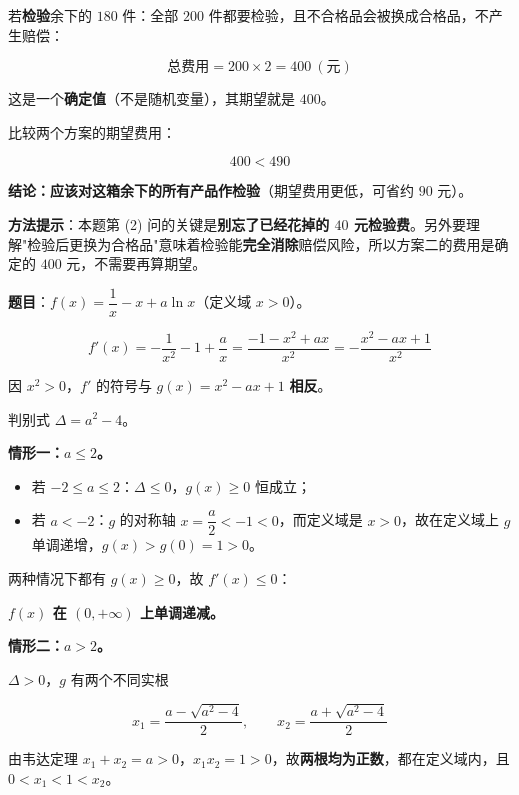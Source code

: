 
若\textbf{检验}余下的 $180$ 件：全部 $200$ 件都要检验，且不合格品会被换成合格品，不产生赔偿：

\[\text{总费用}=200\times2=400\ (\text{元})\]

这是一个\textbf{确定值}（不是随机变量），其期望就是 $400$。

比较两个方案的期望费用：

\[400<490\]

\textbf{结论：应该对这箱余下的所有产品作检验}（期望费用更低，可省约 $90$ 元）。

\begin{gktip}
\textbf{方法提示}：本题第 (2) 问的关键是\textbf{别忘了已经花掉的 $40$ 元检验费}。另外要理解"检验后更换为合格品"意味着检验能\textbf{完全消除}赔偿风险，所以方案二的费用是确定的 $400$ 元，不需要再算期望。
\end{gktip}

\par\medskip


\textbf{题目}：$f(x)=\dfrac1x-x+a\ln x$（定义域 $x>0$）。


\[f'(x)=-\frac1{x^{2}}-1+\frac ax=\frac{-1-x^{2}+ax}{x^{2}}=-\frac{x^{2}-ax+1}{x^{2}}\]

因 $x^{2}>0$，$f'$ 的符号与 $g(x)=x^{2}-ax+1$ \textbf{相反}。

判别式 $\Delta=a^{2}-4$。

\textbf{情形一：$a\le2$。}

\begin{itemize}
\item 若 $-2\le a\le2$：$\Delta\le0$，$g(x)\ge0$ 恒成立；
\item 若 $a<-2$：$g$ 的对称轴 $x=\dfrac a2<-1<0$，而定义域是 $x>0$，故在定义域上 $g$ 单调递增，$g(x)>g(0)=1>0$。
\end{itemize}

两种情况下都有 $g(x)\ge0$，故 $f'(x)\le0$：

\textbf{$f(x)$ 在 $(0,+\infty)$ 上单调递减。}

\textbf{情形二：$a>2$。}

$\Delta>0$，$g$ 有两个不同实根

\[x_1=\frac{a-\sqrt{a^{2}-4}}2,\qquad x_2=\frac{a+\sqrt{a^{2}-4}}2\]

由韦达定理 $x_1+x_2=a>0$，$x_1x_2=1>0$，故\textbf{两根均为正数}，都在定义域内，且 $0<x_1<1<x_2$。

